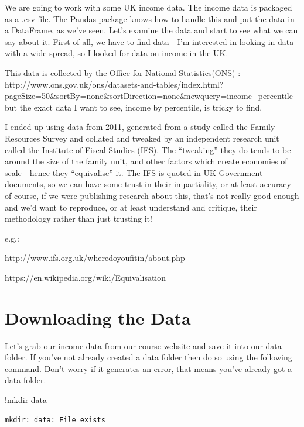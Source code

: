 \documentclass[
  letterpaper,
  DIV=11,
  numbers=noendperiod]{scrreprt}
\newenvironment{Shaded}{\begin{snugshade}}{\end{snugshade}}
\newcommand{\NormalTok}[1]{\textcolor[rgb]{0.00,0.23,0.31}{#1}}
\newcommand{\OperatorTok}[1]{\textcolor[rgb]{0.37,0.37,0.37}{#1}}
\begin{document}
We are going to work with some UK income data. The income data is
packaged as a .csv file. The Pandas package knows how to handle this and
put the data in a DataFrame, as we've seen. Let's examine the data and
start to see what we can say about it. First of all, we have to find
data - I'm interested in looking in data with a wide spread, so I looked
for data on income in the UK.

This data is collected by the Office for National Statistics(ONS) :
http://www.ons.gov.uk/ons/datasets-and-tables/index.html?pageSize=50\&sortBy=none\&sortDirection=none\&newquery=income+percentile
- but the exact data I want to see, income by percentile, is tricky to
find.

I ended up using data from 2011, generated from a study called the
Family Resources Survey and collated and tweaked by an independent
research unit called the Institute of Fiscal Studies (IFS). The
``tweaking'' they do tends to be around the size of the family unit, and
other factors which create economies of scale - hence they
``equivalise'' it. The IFS is quoted in UK Government documents, so we
can have some trust in their impartiality, or at least accuracy - of
course, if we were publishing research about this, that's not really
good enough and we'd want to reproduce, or at least understand and
critique, their methodology rather than just trusting it!

e.g.:

http://www.ifs.org.uk/wheredoyoufitin/about.php

https://en.wikipedia.org/wiki/Equivalisation

\hypertarget{downloading-the-data}{%
\section{Downloading the Data}\label{downloading-the-data}}

Let's grab our income data from our course website and save it into our
data folder. If you've not already created a data folder then do so
using the following command. Don't worry if it generates an error, that
means you've already got a data folder.

\begin{Shaded}
\begin{Highlighting}[]
\OperatorTok{!}\NormalTok{mkdir data}
\end{Highlighting}
\end{Shaded}

\begin{verbatim}
mkdir: data: File exists
\end{verbatim}
\end{document}
